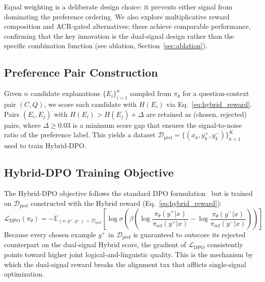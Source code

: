 Equal weighting is a deliberate design choice: it prevents either signal from dominating the preference ordering. We also explore multiplicative reward composition and ACR-gated alternatives; these achieve comparable performance, confirming that the key innovation is the dual-signal design rather than the specific combination function (see ablation, Section~\ref{sec:ablation}).

\subsection{Preference Pair Construction}
\label{sec:pref_construction}

Given $n$ candidate explanations $\{E_i\}_{i=1}^n$ sampled from $\pi_\theta$ for a question-context pair $(C, Q)$, we score each candidate with $H(E_i)$ via Eq.~\ref{eq:hybrid_reward}. Pairs $(E_i, E_j)$ with $H(E_i) > H(E_j) + \Delta$ are retained as (chosen, rejected) pairs, where $\Delta \geq 0.03$ is a minimum score gap that ensures the signal-to-noise ratio of the preference label. This yields a dataset $\mathcal{D}_\text{pref} = \{(x_k, y_k^+, y_k^-)\}_{k=1}^K$ used to train Hybrid-DPO.

\subsection{Hybrid-DPO Training Objective}
\label{sec:hybrid_dpo}

The Hybrid-DPO objective follows the standard DPO formulation~\cite{rafailov2023direct} but is trained on $\mathcal{D}_\text{pref}$ constructed with the Hybrid reward (Eq.~\ref{eq:hybrid_reward}):
\begin{equation}
\mathcal{L}_\text{DPO}(\pi_\theta) = -\mathbb{E}_{(x,y^+,y^-)\sim\mathcal{D}_\text{pref}}\!\left[\log\sigma\!\left(\beta\!\left(\log\frac{\pi_\theta(y^+|x)}{\pi_\text{ref}(y^+|x)} - \log\frac{\pi_\theta(y^-|x)}{\pi_\text{ref}(y^-|x)}\right)\right)\right]
\label{eq:dpo_loss}
\end{equation}
Because every chosen example $y^+$ in $\mathcal{D}_\text{pref}$ is guaranteed to outscore its rejected counterpart on the dual-signal Hybrid score, the gradient of $\mathcal{L}_\text{DPO}$ consistently points toward higher joint logical-and-linguistic quality. This is the mechanism by which the dual-signal reward breaks the alignment tax that afflicts single-signal optimization.
